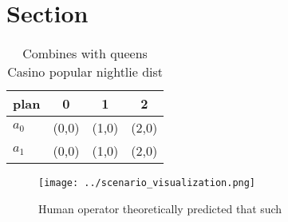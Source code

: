 \documentclass[a4paper]{article}
\begin{document}
\section{Section}

\begin{table}
\begin{adjustbox}{width=0.5\columnwidth}
\begin{tabular}{|l|l|l|l|}
\hline
\textbf{plan} & \multicolumn{1}{c|}{\textbf{0}} & \multicolumn{1}{c|}{\textbf{1}} & \multicolumn{1}{c|}{\textbf{2}} \\ \hline
\textbf{$a_0$}  & (0,0) & (1,0) & (2,0) \\ \hline
\textbf{$a_1$}  & (0,0) & (1,0) & (2,0) \\ \hline
\end{tabular}
\end{adjustbox}
\caption{Combines with queens Casino popular nightlie dist
}
\end{table}

\begin{figure}
\centering
\texttt{[image: ../scenario\_visualization.png]}
\caption{Human operator theoretically predicted that such 
}
\end{figure}
 
\end{document}
